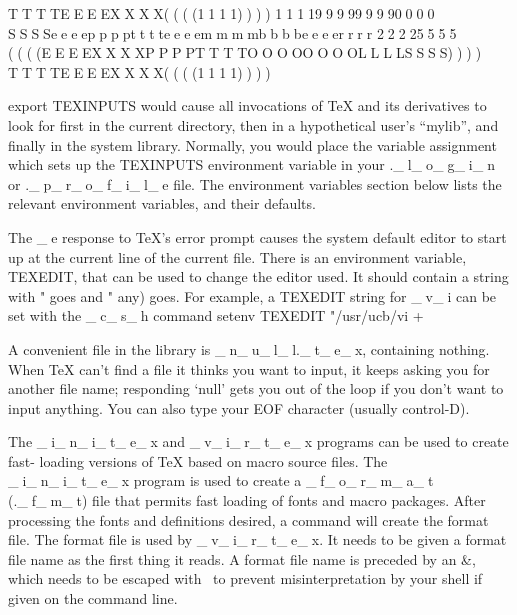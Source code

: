      TTTTEEEEXXXX((((1111))))            1111999999990000 SSSSeeeepppptttteeeemmmmbbbbeeeerrrr 22225555 ((((EEEEXXXXPPPPTTTTOOOOOOOOLLLLSSSS))))             TTTTEEEEXXXX((((1111))))



              export TEXINPUTS
          would cause all invocations of TeX and its derivatives to
          look for  first in the current directory, then
          in a hypothetical user's ``mylib'', and finally in the
          system library.  Normally, you would place the variable
          assignment which sets up the TEXINPUTS environment variable
          in your ._l_o_g_i_n or ._p_r_o_f_i_l_e file.  The environment variables
          section below lists the relevant environment variables, and
          their defaults.

          The _e response to TeX's error prompt causes the system
          default editor to start up at the current line of the
          current file.  There is an environment variable, TEXEDIT,
          that can be used to change the editor used.  It should
          contain a string with "%
          goes and "%
          any) goes.  For example, a TEXEDIT string for _v_i can be set
          with the _c_s_h command
              setenv TEXEDIT "/usr/ucb/vi +%

          A convenient file in the library is _n_u_l_l._t_e_x, containing
          nothing.  When TeX can't find a file it thinks you want to
          input, it keeps asking you for another file name;
          responding `null' gets you out of the loop if you don't want
          to input anything.  You can also type your EOF character
          (usually control-D).

          The _i_n_i_t_e_x and _v_i_r_t_e_x programs can be used to create fast-
          loading versions of TeX based on macro source files.  The
          _i_n_i_t_e_x program is used to create a _f_o_r_m_a_t (._f_m_t) file that
          permits fast loading of fonts and macro packages.  After
          processing the fonts and definitions desired, a \dump
          command will create the format file.  The format file is
          used by _v_i_r_t_e_x. It needs to be given a format file name as
          the first thing it reads.  A format file name is preceded by
          an &, which needs to be escaped with \ to prevent
          misinterpretation by your shell if given on the command
          line.

